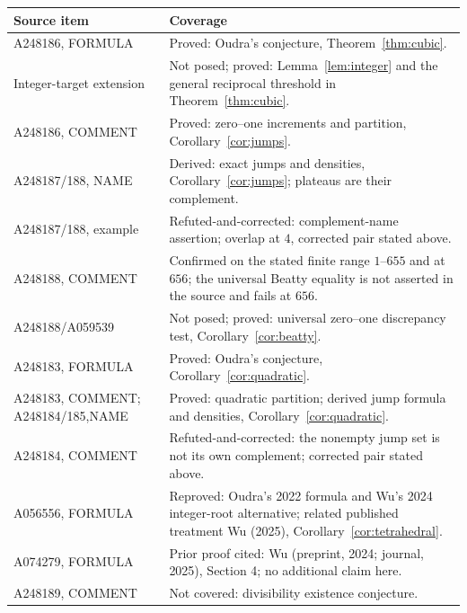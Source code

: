 \documentclass[11pt]{article}
\begin{document}
\small
\begin{longtable}{@{}>{\raggedright\arraybackslash}p{.28\linewidth}p{.65\linewidth}@{}}
\toprule
Source item & Coverage \\
\midrule
\endhead
A248186, FORMULA & Proved: Oudra's conjecture, Theorem~\ref{thm:cubic}. \\
Integer-target extension & Not posed; proved: Lemma~\ref{lem:integer} and the general reciprocal threshold in Theorem~\ref{thm:cubic}. \\
A248186, COMMENT & Proved: zero--one increments and partition, Corollary~\ref{cor:jumps}. \\
A248187/188, NAME & Derived: exact jumps and densities, Corollary~\ref{cor:jumps}; plateaus are their complement. \\
A248187/188, example & Refuted-and-corrected: complement-name assertion; overlap at $4$, corrected pair stated above. \\
A248188, COMMENT & Confirmed on the stated finite range $1$--$655$ and at $656$; the universal Beatty equality is not asserted in the source and fails at $656$. \\
A248188/A059539 & Not posed; proved: universal zero--one discrepancy test, Corollary~\ref{cor:beatty}. \\
A248183, FORMULA & Proved: Oudra's conjecture, Corollary~\ref{cor:quadratic}. \\
A248183, COMMENT; A248184/185,\newline NAME & Proved: quadratic partition; derived jump formula and densities, Corollary~\ref{cor:quadratic}. \\
A248184, COMMENT & Refuted-and-corrected: the nonempty jump set is not its own complement; corrected pair stated above. \\
A056556, FORMULA & Reproved: Oudra's 2022 formula and Wu's 2024 integer-root alternative; related published treatment Wu (2025), Corollary~\ref{cor:tetrahedral}. \\
A074279, FORMULA & Prior proof cited: Wu (preprint, 2024; journal, 2025), Section 4; no additional claim here. \\
A248189, COMMENT & Not covered: divisibility existence conjecture. \\
\bottomrule
\end{longtable}
\normalsize
\end{document}
